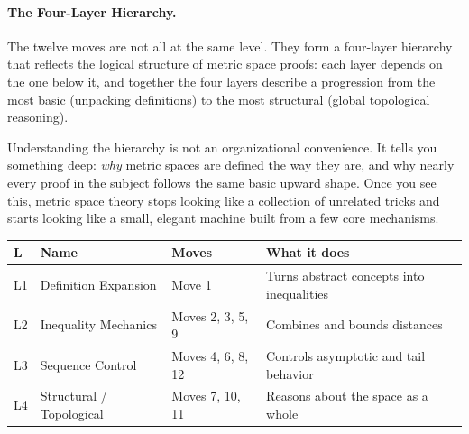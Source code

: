 \paragraph{The Four-Layer Hierarchy.}

The twelve moves are not all at the same level. They form a four-layer
hierarchy that reflects the logical structure of metric space proofs:
each layer depends on the one below it, and together the four layers
describe a progression from the most basic (unpacking definitions) to
the most structural (global topological reasoning).

Understanding the hierarchy is not an organizational convenience.
It tells you something deep: \emph{why} metric spaces are defined the
way they are, and why nearly every proof in the subject follows the
same basic upward shape. Once you see this, metric space theory stops
looking like a collection of unrelated tricks and starts looking like
a small, elegant machine built from a few core mechanisms.

\begin{tcolorbox}[colback=gray!6, colframe=gray!40, arc=2pt,
  left=6pt, right=6pt, top=4pt, bottom=4pt,
  title={\small\textbf{The Four Levels}},
  fonttitle=\small\bfseries]
\small
\renewcommand{\arraystretch}{1.4}
\begin{tabular}{p{}p{}p{}p{}}
\toprule
\textbf{L} & \textbf{Name} & \textbf{Moves} & \textbf{What it does} \\
\midrule
L1 & Definition Expansion & Move 1 &
  Turns abstract concepts into inequalities \\
L2 & Inequality Mechanics & Moves 2, 3, 5, 9 &
  Combines and bounds distances \\
L3 & Sequence Control & Moves 4, 6, 8, 12 &
  Controls asymptotic and tail behavior \\
L4 & Structural / Topological & Moves 7, 10, 11 &
  Reasons about the space as a whole \\
\bottomrule
\end{tabular}
\end{tcolorbox}

